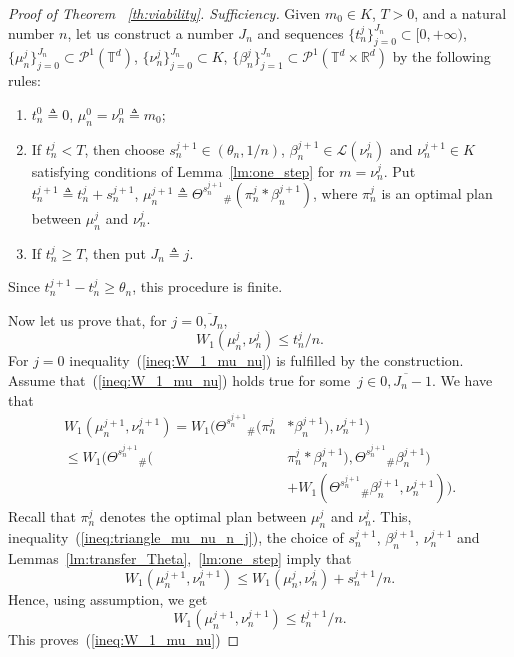 \documentclass[12pt]{article}
\newcommand{\ptd}{\mathcal{P}^1(\mathbb{T}^d)}
\newcommand{\ptrd}{\mathcal{P}^1(\mathbb{T}^d\times \mathbb{R}^d)}
\begin{document}
\begin{proof}[Proof of Theorem ~\ref{th:viability}. Sufficiency]
Given $m_0\in K$, $T>0$, and a natural number $n$, let us construct  a number $J_n$ and sequences $\{t_n^j\}_{j=0}^{J_n}\subset [0,+\infty)$, $\{\mu_n^j\}_{j=0}^{J_n}\subset\ptd$, $\{\nu_n^j\}_{j=0}^{J_n}\subset K$, $\{\beta^j_n\}_{j=1}^{J_n}\subset \ptrd$ by the following rules:
\begin{enumerate}
	\item $t_n^0\triangleq 0$, $\mu_n^0=\nu_n^0\triangleq m_0$;
	\item If $t_n^j<T$, then choose $s_n^{j+1}\in (\theta_n,1/n)$, $\beta_n^{j+1}\in\mathcal{L}(\nu_n^j)$ and $\nu_n^{j+1}\in K$ satisfying conditions of Lemma~\ref{lm:one_step} for $m=\nu_n^j$. Put $t_n^{j+1}\triangleq t_n^j+s_n^{j+1}$, $\mu_n^{j+1}\triangleq \Theta^{s_n^{j+1}}{}_\#(\pi_n^j*\beta_n^{j+1})$, where $\pi_n^j$ is an optimal plan between $\mu_n^j$ and $\nu_n^j$.
	\item If $t_n^j\geq T$, then put $J_n\triangleq j$.
\end{enumerate}
Since $t_n^{j+1}-t_n^j\geq\theta_n$, this procedure is finite. 

Now let us prove that, for $j=\overline{0,J_n}$,
\begin{equation}\label{ineq:W_1_mu_nu}
W_1(\mu_n^j,\nu_n^j)\leq t_n^j/n.
\end{equation}
For $j=0$ inequality~(\ref{ineq:W_1_mu_nu}) is fulfilled by the construction. Assume that~(\ref{ineq:W_1_mu_nu}) holds true for some~$j\in \overline{0,J_n-1}$. We have that
\begin{equation}\label{ineq:triangle_mu_nu_n_j}
\begin{split}
W_1(\mu_n^{j+1},\nu_n^{j+1})=W_1(\Theta^{s_n^{j+1}}{}_\#(\pi_n^j&*\beta_n^{j+1}),\nu_n^{j+1})\\ \leq W_1(\Theta^{s_n^{j+1}}{}_\#(&\pi_n^j*\beta_n^{j+1}),\Theta^{s_n^{j+1}}{}_\#\beta_n^{j+1})\\
&+ W_1(\Theta^{s_n^{j+1}}{}_\#\beta_n^{j+1},\nu_n^{j+1})).
\end{split}
\end{equation}
Recall that $\pi_n^j$ denotes the optimal plan between $\mu_n^j$ and $\nu_n^j$.
This, inequality~(\ref{ineq:triangle_mu_nu_n_j}), the choice of $s_n^{j+1}$, $\beta_n^{j+1}$, $\nu_n^{j+1}$ and Lemmas~\ref{lm:transfer_Theta},~\ref{lm:one_step} imply that
$$W_1(\mu_n^{j+1},\nu_n^{j+1})\leq W_1(\mu_n^{j},\nu_n^{j})+s_n^{j+1}/n. $$ Hence, using assumption, we get $$W_1(\mu_n^{j+1},\nu_n^{j+1})\leq t_n^{j+1}/n.$$ This proves~(\ref{ineq:W_1_mu_nu})


\end{proof}
\end{document}
